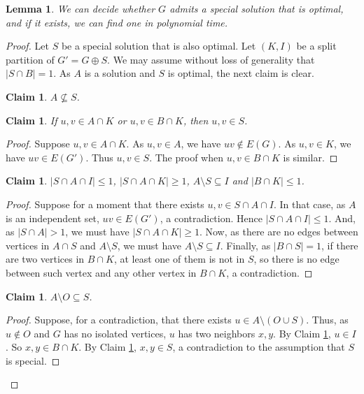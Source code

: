 \documentclass[11pt]{article}
\newtheorem{lemma}[theorem]{Lemma}
\newtheorem{claim}[theorem]{Claim}
\theoremstyle{definition}
\begin{document}
\begin{lemma}\label{lemma:solving-special-solutions}
We can decide whether
$G$ admits a special solution that is optimal, and if it exists, we can find one in polynomial time.
\end{lemma}
\begin{proof}

    Let $S$ be a special solution that is also optimal.
    Let $(K,I)$ be a split partition of $G'=G \oplus S$.
We may assume without loss of generality that $|S \cap B|=1$.
As $A$ is a solution and $S$ is optimal, the next claim is clear.
      \begin{claim}\label{claim:A-not-subset-S}
         $A \not \subseteq S$.
    \end{claim}

    
    
    \begin{claim}\label{claim:uv-in-A-cap-K-then-uv-in-S}
        If $u,v \in A \cap K$ or $u,v \in B \cap K$, then $u,v \in S$.
    \end{claim}
    \begin{proof}
        Suppose $u,v \in A \cap K$. 
        As $u,v \in A$, we have $uv \notin E(G)$.
        As $u,v \in K$, we have $uv \in E(G')$.
        Thus $u,v \in S$. The proof when $u,v \in B \cap K$ is similar.
    \end{proof}

    \begin{claim}\label{claim:varios}
        $|S\cap A\cap I| \leq 1$, $|S\cap A \cap K| \geq 1$, $A \setminus S \subseteq I$ and $|B \cap K| \leq 1$.
    \end{claim}
    \begin{proof}
        Suppose for a moment that there exists $u,v \in S\cap A \cap I$. In that case, as $A$ is an independent set, $uv \in E(G')$, a contradiction. Hence $|S\cap A\cap I| \leq 1$. And, as $|S\cap A|>1$, we must have $|S\cap A \cap K| \geq 1$.
        Now, as there are no edges between vertices in $A \cap S$ and $A \setminus S$, we must have  $A \setminus S \subseteq I$.
        Finally, as $|B \cap S| = 1$, if there are two vertices in $B \cap K$, at least one of them is not in $S$, so there is no edge between such vertex and any other vertex in $B \cap K$, a contradiction.
    \end{proof}
    
    \begin{claim}\label{claim:A-set-minus-O-subset-S}
         $A \setminus O \subseteq S$.
    \end{claim}
    \begin{proof}
         Suppose, for a contradiction, that there exists $u \in A \setminus (O \cup S)$.
         Thus, as $u \notin O$ and $G$ has no isolated vertices, $u$ has two neighbors $x,y$.
         By Claim \ref{claim:varios}, $u \in I$. So $x,y \in B \cap K$.
          By Claim \ref{claim:uv-in-A-cap-K-then-uv-in-S}, $x,y \in S$, a contradiction to the assumption that $S$ is special.
    \end{proof}
    

\end{proof}
\end{document}
